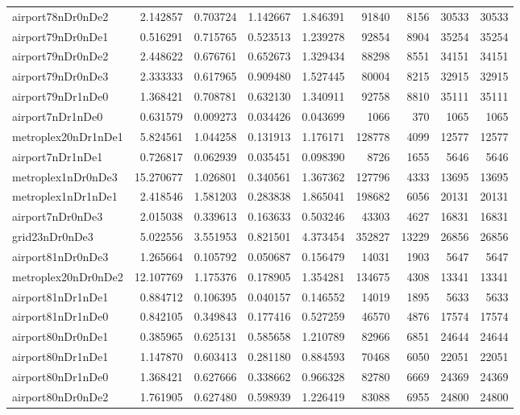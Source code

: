 \begin{longtable}{|l|r|r|r|r|r|r|r|r|}
airport78nDr0nDe2 & 2.142857 & 0.703724 & 1.142667 & 1.846391 & 91840 & 8156 & 30533 & 30533 \\
airport79nDr0nDe1 & 0.516291 & 0.715765 & 0.523513 & 1.239278 & 92854 & 8904 & 35254 & 35254 \\
airport79nDr0nDe2 & 2.448622 & 0.676761 & 0.652673 & 1.329434 & 88298 & 8551 & 34151 & 34151 \\
airport79nDr0nDe3 & 2.333333 & 0.617965 & 0.909480 & 1.527445 & 80004 & 8215 & 32915 & 32915 \\
airport79nDr1nDe0 & 1.368421 & 0.708781 & 0.632130 & 1.340911 & 92758 & 8810 & 35111 & 35111 \\
airport7nDr1nDe0 & 0.631579 & 0.009273 & 0.034426 & 0.043699 & 1066 & 370 & 1065 & 1065 \\
metroplex20nDr1nDe1 & 5.824561 & 1.044258 & 0.131913 & 1.176171 & 128778 & 4099 & 12577 & 12577 \\
airport7nDr1nDe1 & 0.726817 & 0.062939 & 0.035451 & 0.098390 & 8726 & 1655 & 5646 & 5646 \\
metroplex1nDr0nDe3 & 15.270677 & 1.026801 & 0.340561 & 1.367362 & 127796 & 4333 & 13695 & 13695 \\
metroplex1nDr1nDe1 & 2.418546 & 1.581203 & 0.283838 & 1.865041 & 198682 & 6056 & 20131 & 20131 \\
airport7nDr0nDe3 & 2.015038 & 0.339613 & 0.163633 & 0.503246 & 43303 & 4627 & 16831 & 16831 \\
grid23nDr0nDe3 & 5.022556 & 3.551953 & 0.821501 & 4.373454 & 352827 & 13229 & 26856 & 26856 \\
airport81nDr0nDe3 & 1.265664 & 0.105792 & 0.050687 & 0.156479 & 14031 & 1903 & 5647 & 5647 \\
metroplex20nDr0nDe2 & 12.107769 & 1.175376 & 0.178905 & 1.354281 & 134675 & 4308 & 13341 & 13341 \\
airport81nDr1nDe1 & 0.884712 & 0.106395 & 0.040157 & 0.146552 & 14019 & 1895 & 5633 & 5633 \\
airport81nDr1nDe0 & 0.842105 & 0.349843 & 0.177416 & 0.527259 & 46570 & 4876 & 17574 & 17574 \\
airport80nDr0nDe1 & 0.385965 & 0.625131 & 0.585658 & 1.210789 & 82966 & 6851 & 24644 & 24644 \\
airport80nDr1nDe1 & 1.147870 & 0.603413 & 0.281180 & 0.884593 & 70468 & 6050 & 22051 & 22051 \\
airport80nDr1nDe0 & 1.368421 & 0.627666 & 0.338662 & 0.966328 & 82780 & 6669 & 24369 & 24369 \\
airport80nDr0nDe2 & 1.761905 & 0.627480 & 0.598939 & 1.226419 & 83088 & 6955 & 24800 & 24800 \\

\end{longtable}
